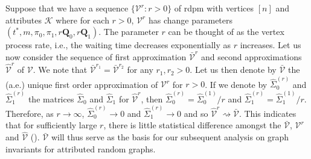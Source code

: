 \documentclass[final]{IEEEtran}
\theoremstyle{definition}
\begin{document}
Suppose that we have a sequence $\{\mathscr{V}^{r} \colon r > 0 \}$ of
rdpm with vertices $[n]$ and attributes $\mathscr{K}$ where for each
$r > 0$, $\mathscr{V}^{r}$ has change parameters $(t^{*}, m, \pi_0,
\pi_1, r \mathbf{Q}_0, r \mathbf{Q}_1)$. The parameter $r$ can be
thought of as the vertex process rate, i.e., the waiting time
decreases exponentially as $r$ increases. Let us now consider the
sequence of first approximation $\bar{\mathscr{V}}^{r}$ and second
approximations $\widehat{\mathscr{V}}^{r}$ of $\mathscr{V}$. We note
that $\bar{\mathscr{V}}^{r_1} = \bar{\mathscr{V}}^{r_2}$ for any $r_1,
r_2 > 0$. Let us then denote by $\bar{\mathscr{V}}$ the (a.e.) unique
first order approximation of $\mathscr{V}^{r}$ for $r > 0$. If we
denote by $\widehat{\Sigma}_{0}^{(r)}$ and
$\widehat{\Sigma}_{1}^{(r)}$ the matrices $\widehat{\Sigma}_0$ and
$\widehat{\Sigma}_1$ for $\widehat{\mathscr{V}}^{r}$, then
$\widehat{\Sigma}_0^{(r)} = \widehat{\Sigma}_0^{(1)}/r$ and
$\widehat{\Sigma}_{1}^{(r)} = \widehat{\Sigma}_1^{(1)}/r$. Therefore,
as $r \rightarrow \infty$, $\widehat{\Sigma}_0^{(r)} \rightarrow 0$
and $\widehat{\Sigma}_1^{(r)} \rightarrow 0$ and so
$\widehat{\mathscr{V}}^{r} \rightsquigarrow
\bar{\mathscr{V}}$. This indicates that for sufficiently large $r$,
there is little statistical difference amongst the $\bar{\mathscr{V}}$,
$\mathscr{V}^{r}$ and $\widehat{\mathscr{V}}$ (\cite[Theorem
2]{lee:_laten_proces_model_time_attrib_random_graph}). $\bar{\mathscr{V}}$
will thus serve as the basis for our subsequent analysis on graph
invariants for attributed random graphs. 
\end{document}
